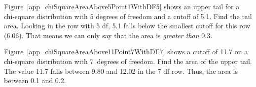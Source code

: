 \begin{examplewrap}
\begin{nexample}{Figure~\ref{app_chiSquareAreaAbove5Point1WithDF5} shows an upper tail for a chi-square distribution with 5 degrees of freedom and a cutoff of 5.1. Find the tail area.}
Looking in the row with 5 df, 5.1 falls below the smallest cutoff for this row (6.06). That means we can only say that the area is \emph{greater than} 0.3.
\end{nexample}
\end{examplewrap}

\begin{examplewrap}
\begin{nexample}{Figure~\ref{app_chiSquareAreaAbove11Point7WithDF7}
    shows a cutoff of 11.7 on a chi-square distribution with
    7~degrees of freedom.
    Find the area of the upper tail.}
  The value 11.7 falls between 9.80 and 12.02 in the 7 df row.
  Thus, the area is between 0.1 and 0.2.
\end{nexample}
\end{examplewrap}

%


